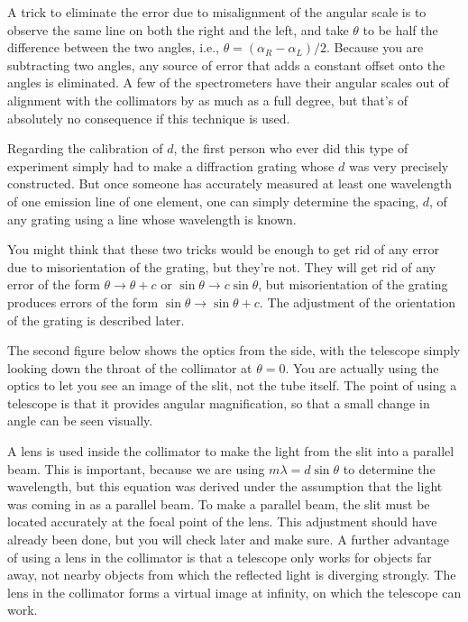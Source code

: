 
A trick to eliminate the error due to 
misalignment of the angular scale is to observe the same line on both the
right and the left, and take $\theta$ to be half the difference
between the two angles, i.e., $\theta=(\alpha_R-\alpha_L)/2$.
Because you are subtracting two angles, any source of error
that adds a constant offset onto the angles is eliminated.
A few of the spectrometers have their angular scales out of alignment
with the collimators by as much as a full degree, but that's of
absolutely no consequence if this technique is used.

Regarding the calibration of $d$, 
the first person who ever did this type of experiment simply
had to make a diffraction grating whose $d$ was very precisely
constructed. But once someone
has accurately measured at least one wavelength of one
emission line of one element, one can simply
determine the spacing, $d$, of any grating using a line
whose wavelength is known.

You might think that these two tricks would be enough to get rid
of any error due to misorientation of the grating, but they're not.
They will get rid of any error of the form $\theta\rightarrow\theta+c$
or $\sin\theta\rightarrow c\sin\theta$, but misorientation of the grating
produces errors of the form $\sin\theta\rightarrow\sin\theta+c$.
The adjustment of the orientation of the grating is described later.


The second figure below shows the optics from the side, with the
telescope simply looking down the throat of the collimator
at $\theta=0$. You are actually using the optics to let you
see an image of the slit, not the tube itself. The point of
using a telescope is that it provides angular magnification,
so that a small change in angle can be seen visually.

A lens is used inside the collimator to make the light from
the slit into a parallel beam. This is important, because we
are using $m\lambda =d\sin\theta$ to determine the
wavelength, but this equation was derived under the
assumption that the light was coming in as a parallel beam.
To make a parallel beam, the slit must be located accurately
at the focal point of the lens. This adjustment should have
already been done, but you will check later and make sure. A
further advantage of using a lens in the collimator is that
a telescope only works for objects far away, not nearby
objects from which the reflected light is diverging
strongly.  The lens in the collimator forms a virtual image
at infinity, on which the telescope can work.

